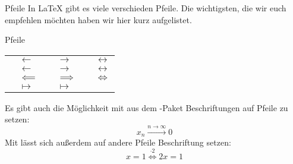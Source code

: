 \begin{frame}[fragile]{Pfeile}
In \LaTeX{} gibt es viele verschieden Pfeile. Die wichtigsten, die wir euch empfehlen möchten haben wir hier kurz aufgelistet. 
\begin{block}{Pfeile}
\centering
\scriptsize
\begin{tabular}{*{3}{|rl}|}\hline
		 & $\leftarrow$ & 
		 & $\rightarrow$ &
		 & $\leftrightarrow$ \\
		 & $\longleftarrow$ & 
		 & $\longrightarrow$ &
		 & $\longleftrightarrow$ \\
		 & $\impliedby$ & 
		 & $\implies$ &
		 & $\iff$ \\
		 & $\mapsto$ & 
		 & $\longmapsto$ & 
		& \\ \hline
\end{tabular}
\end{block}\pause
Es gibt auch die Möglichkeit mit  aus dem -Paket Beschriftungen auf Pfeile zu setzen: 
\[
    x_n\xrightarrow{n\rightarrow\infty}0
\]
Mit  lässt sich außerdem auf andere Pfeile Beschriftung setzen: 
\[
    x=1 \overset{\cdot2}{\iff} 2x=1
\]
\end{frame}
